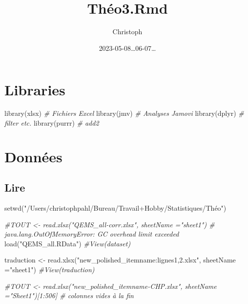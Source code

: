 \documentclass[
]{article}
\title{Théo3.Rmd}
\author{Christoph}
\date{2023-05-08\ldots06-07\ldots{}}
\newenvironment{Shaded}{\begin{snugshade}}{\end{snugshade}}
\newcommand{\AttributeTok}[1]{\textcolor[rgb]{0.77,0.63,0.00}{#1}}
\newcommand{\CommentTok}[1]{\textcolor[rgb]{0.56,0.35,0.01}{\textit{#1}}}
\newcommand{\FunctionTok}[1]{\textcolor[rgb]{0.00,0.00,0.00}{#1}}
\newcommand{\NormalTok}[1]{#1}
\newcommand{\OtherTok}[1]{\textcolor[rgb]{0.56,0.35,0.01}{#1}}
\newcommand{\StringTok}[1]{\textcolor[rgb]{0.31,0.60,0.02}{#1}}
\begin{document}
\maketitle

\hypertarget{libraries}{%
\section{Libraries}\label{libraries}}

\begin{Shaded}
\begin{Highlighting}[]
\FunctionTok{library}\NormalTok{(xlsx)                                         }\CommentTok{\# Fichiers Excel}
\FunctionTok{library}\NormalTok{(jmv)                                          }\CommentTok{\# Analyses Jamovi}
\FunctionTok{library}\NormalTok{(dplyr)                                        }\CommentTok{\# filter etc.}
\FunctionTok{library}\NormalTok{(purrr)                                        }\CommentTok{\# add2}
\end{Highlighting}
\end{Shaded}

\hypertarget{donnuxe9es}{%
\section{Données}\label{donnuxe9es}}

\hypertarget{lire}{%
\subsection{Lire}\label{lire}}

\begin{Shaded}
\begin{Highlighting}[]
\FunctionTok{setwd}\NormalTok{(}\StringTok{"/Users/christophpahl/Bureau/Travail+Hobby/Statistiques/Théo"}\NormalTok{)}

\CommentTok{\#TOUT \textless{}{-} read.xlsx("QEMS\_all{-}corr.xlsx", sheetName ="sheet1")  \# java.lang.OutOfMemoryError: GC overhead limit exceeded}
\FunctionTok{load}\NormalTok{(}\StringTok{"QEMS\_all.RData"}\NormalTok{)}
\CommentTok{\#View(dataset)}

\NormalTok{traduction }\OtherTok{\textless{}{-}} \FunctionTok{read.xlsx}\NormalTok{(}\StringTok{"new\_polished\_itemname:lignes1,2.xlsx"}\NormalTok{, }\AttributeTok{sheetName =}\StringTok{"sheet1"}\NormalTok{)}
\CommentTok{\#View(traduction)}

\CommentTok{\#TOUT \textless{}{-} read.xlsx("new\_polished\_itemname{-}CHP.xlsx", sheetName ="Sheet1")[1:506]  \# colonnes vides à la fin}
\end{Highlighting}
\end{Shaded}
\end{document}

